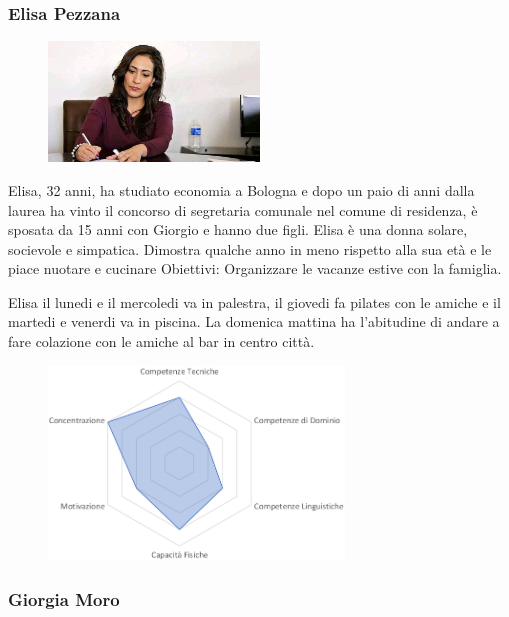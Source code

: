 \documentclass[12pt,italian,]{report}
\begin{document}
\hypertarget{elisa-pezzana-1}{%
\subsubsection{Elisa Pezzana}\label{elisa-pezzana-1}}

\begin{figure}[h]
\centering
\includegraphics[width=0.5\textwidth,height=\textheight]{img/elisa.jpg}
\end{figure}

Elisa, 32 anni, ha studiato economia a Bologna e dopo un paio di anni dalla laurea
ha vinto il concorso di segretaria comunale nel comune di residenza, è
sposata da 15 anni con Giorgio e hanno due figli. Elisa è una donna
solare, socievole e simpatica. Dimostra qualche anno in meno rispetto
alla sua età e le piace nuotare e cucinare Obiettivi: Organizzare le
vacanze estive con la famiglia.

Elisa il lunedi e il mercoledi va in palestra, il giovedi fa pilates con
le amiche e il martedi e venerdi va in piscina. La domenica mattina ha
l'abitudine di andare a fare colazione con le amiche al bar in centro
città.

\begin{figure}[h]
\centering
\includegraphics[width=0.7\textwidth,height=\textheight]{img/elisa_competenze.png}
\end{figure}

\subsubsection{Giorgia Moro}\label{giorgia-moro-1}
\end{document}
